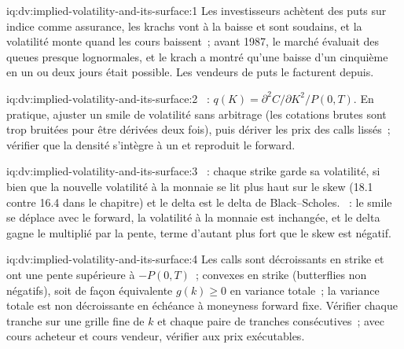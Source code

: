 \begin{solution}{iq:dv:implied-volatility-and-its-surface:1}
Les investisseurs achètent des puts sur indice comme assurance, les krachs vont à la baisse et sont
soudains, et la volatilité monte quand les cours baissent~; avant 1987, le marché évaluait des queues
presque lognormales, et le krach a montré qu'une baisse d'un cinquième en un ou deux jours était possible. Les vendeurs de puts le facturent depuis.
\end{solution}

\begin{solution}{iq:dv:implied-volatility-and-its-surface:2}
~: $q(K)=\partial^2C/\partial K^2/P(0,T)$. En pratique, ajuster un
smile de volatilité sans arbitrage (les cotations brutes sont trop bruitées pour être dérivées deux fois), puis dériver
les prix des calls lissés~; vérifier que la densité s'intègre à un et reproduit le forward.
\end{solution}

\begin{solution}{iq:dv:implied-volatility-and-its-surface:3}
~: chaque strike garde sa volatilité, si bien que la nouvelle volatilité à la monnaie se lit
plus haut sur le skew (18.1 contre 16.4 dans le chapitre) et le delta est le delta de Black--Scholes.
~: le smile se déplace avec le forward, la volatilité à la monnaie est inchangée, et
le delta gagne le  multiplié par la pente, terme d'autant plus fort que le skew est négatif.
\end{solution}

\begin{solution}{iq:dv:implied-volatility-and-its-surface:4}
Les calls sont décroissants en strike et ont une pente supérieure à $-P(0,T)$~; convexes en strike (butterflies
non négatifs), soit de façon équivalente $g(k)\ge0$ en variance totale~; la variance totale est non décroissante
en échéance à moneyness forward fixe. Vérifier chaque tranche sur une grille fine de $k$ et chaque paire de
tranches consécutives~; avec cours acheteur et cours vendeur, vérifier aux prix exécutables.
\end{solution}

